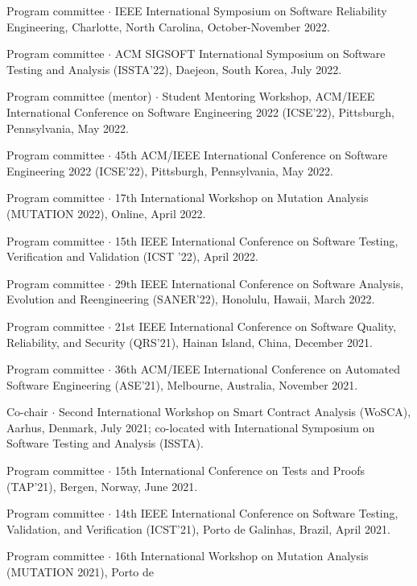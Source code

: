 \documentclass[ComputerScience]{vita}
\begin{document}
\begin{vita}
\begin{Panel and Committee Service}
\item Program committee $\cdot$ IEEE International Symposium on Software Reliability Engineering, Charlotte, North Carolina, October-November 2022.
\item Program committee $\cdot$ ACM SIGSOFT International Symposium on Software Testing and Analysis (ISSTA'22), Daejeon, South Korea, July 2022.
  \item Program committee (mentor) $\cdot$ Student Mentoring Workshop, ACM/IEEE International Conference on 
  Software Engineering 2022 (ICSE'22), Pittsburgh, Pennsylvania, 
  May 2022.
  \item Program committee $\cdot$ 45th ACM/IEEE International Conference on 
  Software Engineering 2022 (ICSE'22), Pittsburgh, Pennsylvania, 
  May 2022.
  \item Program committee $\cdot$ 17th International Workshop on
    Mutation Analysis (MUTATION 2022), Online,
  April 2022.  
  \item Program committee $\cdot$ 15th  IEEE International Conference on Software Testing, Verification and Validation (ICST '22), April 2022.
\item Program committee $\cdot$ 29th IEEE International Conference on Software Analysis, Evolution and Reengineering (SANER'22), Honolulu, Hawaii, March 2022.
    \item Program committee $\cdot$ 21st IEEE International Conference 
    on Software Quality, Reliability, and Security (QRS'21), Hainan 
    Island, China, December 2021.   
\item Program committee $\cdot$ 36th ACM/IEEE International Conference 
  on Automated Software Engineering (ASE'21), Melbourne, Australia, 
  November 2021.
\item Co-chair $\cdot$ Second International Workshop on Smart Contract 
  Analysis (WoSCA), Aarhus, Denmark, July 2021; co-located with 
  International Symposium on Software Testing and Analysis (ISSTA).
\item Program committee $\cdot$ 15th International Conference on Tests
  and Proofs (TAP'21), Bergen, Norway, June 2021.
\item Program committee $\cdot$ 14th IEEE International Conference on 
  Software Testing, Validation, and Verification (ICST'21), Porto de 
  Galinhas, Brazil, April 2021.
  \item Program committee $\cdot$ 16th International Workshop on
    Mutation Analysis (MUTATION 2021), Porto de 

\end{Panel and Committee Service}
\end{vita}
\end{document}
